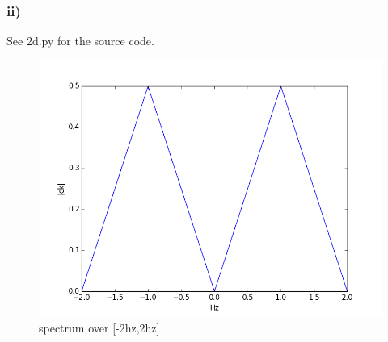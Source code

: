 \subsubsection*{ii)}
See 2d.py for the source code.
\begin{figure}[H]
  \includegraphics[width=\textwidth]{2dii}
  \caption{spectrum over [-2hz,2hz]}
  \label{fig:2dii}
\end{figure}

